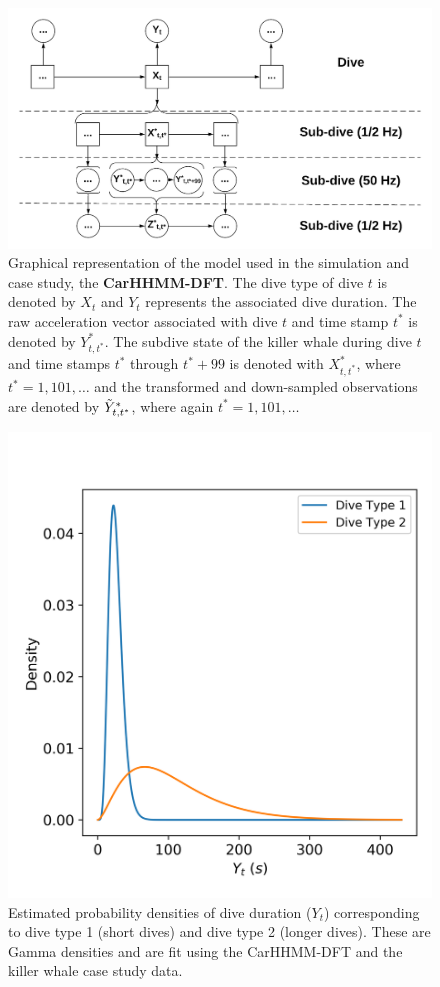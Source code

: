 
\begin{figure}[ht]
	\centering
	\includegraphics[width=5in]{../Plots/CarHHMM-DFT.png}
	\caption{Graphical representation of the model used in the simulation and case study, the \textbf{CarHHMM-DFT}. The dive type of dive $t$ is denoted by $X_t$ and $Y_t$ represents the associated dive duration. The raw acceleration vector associated with dive $t$ and time stamp $t^*$ is denoted by $Y^*_{t,t^*}$. The subdive state of the killer whale during dive $t$ and time stamps $t^*$ through $t^*+99$ is denoted with $X^*_{t,t^*}$, where $t^* = 1,101,\ldots$ and the transformed and down-sampled observations are denoted by $\tilde{Y}^*_{t,t^*}$, where again $t^* = 1,101,\ldots$}
	\label{fig:CarHHMM-DFT}
\end{figure}

\begin{figure}[ht]
	\centering
	\includegraphics[width=5in]{../Plots/CarHHMM2-coarse-emissions.png}
	\caption{Estimated probability densities of dive duration ($Y_t$) corresponding to dive type 1 (short dives) and dive type 2 (longer dives). These are Gamma densities and are fit using the CarHHMM-DFT and the killer whale case study data.}
	\label{fig:coarse_emis}
\end{figure}

